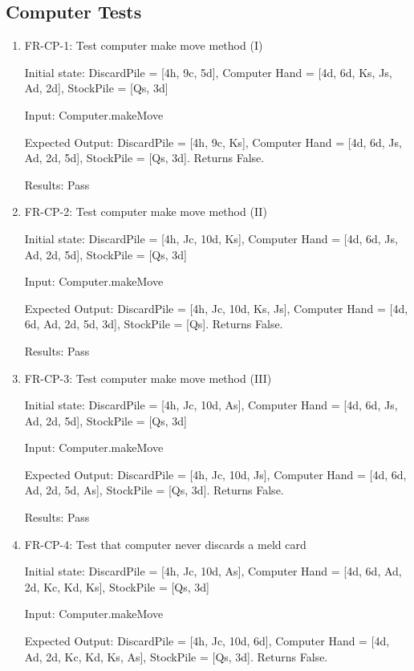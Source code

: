 \documentclass[12pt, titlepage]{article}
\begin{document}
\subsection{Computer Tests}
\begin{enumerate}
    \item FR-CP-1: Test computer make move method (I)
    					
    Initial state: DiscardPile = [4h, 9c, 5d], Computer Hand = [4d, 6d, Ks, Js, Ad, 2d], StockPile = [Qs, 3d]
    		
    Input: Computer.makeMove
    
    Expected Output: DiscardPile = [4h, 9c, Ks], Computer Hand = [4d, 6d, Js, Ad, 2d, 5d], StockPile = [Qs, 3d]. Returns False.
    					
    Results: Pass
    
    \item FR-CP-2: Test computer make move method (II)
    					
    Initial state: DiscardPile = [4h, Jc, 10d, Ks], Computer Hand = [4d, 6d, Js, Ad, 2d, 5d], StockPile = [Qs, 3d]
    		
    Input: Computer.makeMove
    
    Expected Output: DiscardPile = [4h, Jc, 10d, Ks, Js], Computer Hand = [4d, 6d, Ad, 2d, 5d, 3d], StockPile = [Qs]. Returns False.
    					
    Results: Pass
    
    \item FR-CP-3: Test computer make move method (III)
    
    Initial state: DiscardPile = [4h, Jc, 10d, As], Computer Hand = [4d, 6d, Js, Ad, 2d, 5d], StockPile = [Qs, 3d]
    		
    Input: Computer.makeMove
    
    Expected Output: DiscardPile = [4h, Jc, 10d, Js], Computer Hand = [4d, 6d, Ad, 2d, 5d, As], StockPile = [Qs, 3d]. Returns False.
    					
    Results: Pass
    
    \item FR-CP-4: Test that computer never discards a meld card
    
    Initial state: DiscardPile = [4h, Jc, 10d, As], Computer Hand = [4d, 6d, Ad, 2d, Kc, Kd, Ks], StockPile = [Qs, 3d]

    Input: Computer.makeMove
    
    Expected Output: DiscardPile = [4h, Jc, 10d, 6d], Computer Hand = [4d, Ad, 2d, Kc, Kd, Ks, As], StockPile = [Qs, 3d]. Returns False.
    

\end{enumerate}
\end{document}
